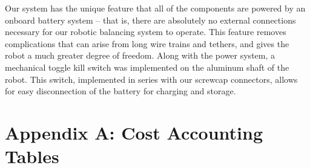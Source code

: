 \documentclass[11pt]{report}
\begin{document}
\begin{spacing}{1.5}
Our system has the unique feature that all of the components are powered by an onboard battery system – that is, there are absolutely no external connections necessary for our robotic balancing system to operate. This feature removes complications that can arise from long wire trains and tethers, and gives the robot a much greater degree of freedom. Along with the power system, a mechanical toggle kill switch was implemented on the aluminum shaft of the robot. This switch, implemented in series with our screwcap connectors, allows for easy disconnection of the battery for charging and storage.

{}

\clearpage

\section*{Appendix A: Cost Accounting Tables}


\end{spacing}
\end{document}
